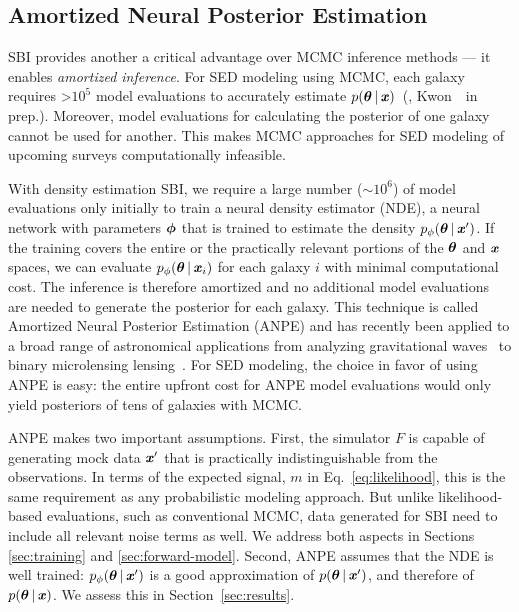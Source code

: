 \subsection{Amortized Neural Posterior Estimation} \label{sec:flow}
SBI provides another a critical advantage over MCMC inference methods --- it
enables \emph{amortized inference}. 
For SED modeling using MCMC, each galaxy requires >$10^5$ model evaluations to
accurately estimate $p(\boldsymbol{\theta} \,|\, \textbf{\textit{x}})$~(\citealt{hahn2022}, 
Kwon~\etal~in prep.).
Moreover, model evaluations for calculating the posterior of one galaxy cannot
be used for another. 
This makes MCMC approaches for SED modeling of upcoming surveys computationally
infeasible.

With density estimation SBI, we require a large number (${\sim}10^6$) of model
evaluations only initially to train a neural density estimator (NDE), a neural
network with parameters $\boldsymbol{\phi}$ that is trained to estimate the density
$p_\phi(\boldsymbol{\theta} \,|\, \textbf{\textit{x}}')$.
If the training covers the entire or the practically relevant portions of the
$\boldsymbol{\theta}$ and $\textbf{\textit{x}}$ spaces, we can evaluate
$p_\phi(\boldsymbol{\theta}\,|\,\textbf{\textit{x}}_i)$ for each galaxy $i$ with minimal computational
cost. 
The inference is therefore amortized and no additional model evaluations are
needed to generate the posterior for each galaxy.
This technique is called  Amortized Neural Posterior Estimation (ANPE) 
and has recently been applied to a broad range of astronomical applications
from analyzing gravitational waves~\citep[\emph{e.g.}][]{wong2020,dax2021} to
binary microlensing lensing~\citep{zhang2021}.
For SED modeling, the choice in favor of using ANPE is easy: the entire upfront
cost for ANPE model evaluations would only yield posteriors of tens of galaxies
with MCMC.

ANPE makes two important assumptions.
First, the simulator $F$ is capable of generating mock data $\textbf{\textit{x}}'$ that is
practically indistinguishable from the observations.
In terms of the expected signal, $m$ in Eq.~\ref{eq:likelihood}, this is the
same requirement as any probabilistic modeling approach. 
But unlike likelihood-based evaluations, such as conventional MCMC, data
generated for SBI need to include all relevant noise terms as well. 
We address both aspects in Sections \ref{sec:training} and \ref{sec:forward-model}.
Second, ANPE assumes that the NDE is well trained: 
$p_\phi(\boldsymbol{\theta} \,|\, \textbf{\textit{x}}')$ is a good approximation of 
$p(\boldsymbol{\theta} \,|\, \textbf{\textit{x}}')$, and therefore of $p(\boldsymbol{\theta} \,|\, \textbf{\textit{x}})$. 
We assess this in Section~\ref{sec:results}.


